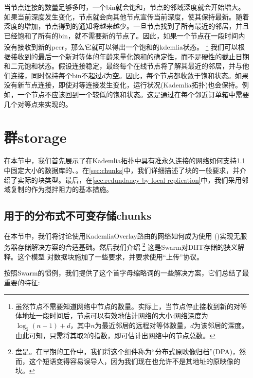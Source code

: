 当节点连接的数量足够多时，一个bin就会饱和，节点的邻域深度就会开始增大。如果当前深度发生变化，节点就会向其他节点宣传当前深度，使其保持最新。随着深度的增加，节点得到的通知将越来越少。一旦节点找到了所有最近的邻居，并且已经饱和了所有的bin，就不需要新的节点了。因此，如果一个节点在一段时间内没有接收到新的peer，那么它就可以得出一个饱和的kdemlia状态。%
%
\footnote{虽然节点不需要知道网络中节点的数量。实际上，当节点停止接收到新的对等体地址一段时间后，节点可以有效地估计网络的大小:网络深度为$\log_2(n+1)+ d$，其中$n$为最近邻居的远程对等体数量，$d$为该邻居的深度。由此可知，只需将其取2的指数，即可估计出网络中的节点总数。}
%
我们可以根据接收到的最后一个新对等体的年龄来量化饱和的确定性，而不是硬性的截止日期和二元饱和状态。假设连接稳定，最终每个在线节点将了解其最近的邻居，并与他们连接，同时保持每个bin不超过$d$为空。因此，每个节点都收敛于饱和状态。如果没有新节点连接，即使对等连接发生变化，运行状况(Kademlia拓扑)也会保持。例如，一个节点不应该回到一个较低的饱和状态。这是通过在每个邻近订单箱中需要几个对等点来实现的。 

\section{群storage\statusgreen}\label{sec:kademlia-storage}

在本节中，我们首先展示了在Kademlia拓扑中具有准永久连接的网络如何支持\ref{sec:disc}中固定大小的数据库的、。在\ref{sec:chunks}中，我们详细描述了块的一般要求，并介绍了实际的块类型。最后，在\ref{sec:redundancy-by-local-replication}中，我们采用邻域复制的作为搅拌阻力的基本措施。

\subsection{用于的分布式不可变存储chunks\statusgreen}\label{sec:disc}
 
在本节中，我们将讨论使用KademliaOverlay路由的网络如何成为使用 ()实现无服务器存储解决方案的合适基础。然后我们介绍%
%
\footnote{盘是。在早期的工作中，我们将这个组件称为“分布式原映像归档”(DPA)，然而，这个短语变得容易误导人，因为我们现在也允许不是其地址的原映像的块。}
% 
这是Swarm对DHT存储的狭义解释。这个模型 
对数据块施加了一些要求，并要求使用“上传”协议。 

按照Swarm的惯例，我们提供了这个首字母缩略词的一些解决方案，它们总结了最重要的特征:


